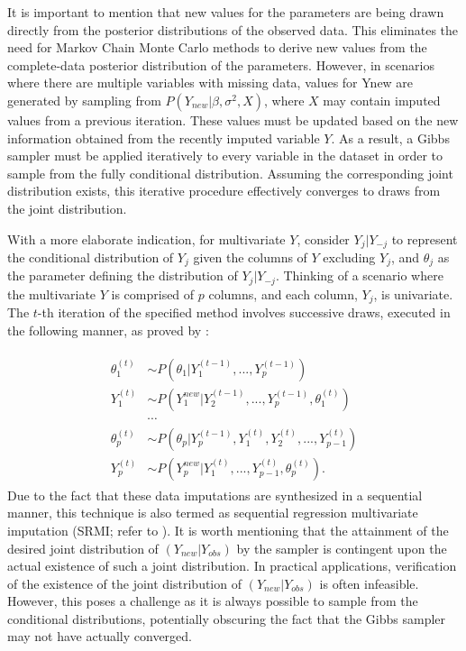It is important to mention that new values for the parameters are being drawn directly from the posterior distributions of the observed data. This eliminates the need for Markov Chain Monte Carlo methods to derive new values from the complete-data posterior distribution of the parameters. However, in scenarios where there are multiple variables with missing data, values for Ynew are generated by sampling from $P(Y_{new} | \beta, \sigma^2, X)$, where $X$ may contain imputed values from a previous iteration. These values must be updated based on the new information obtained from the recently imputed variable $Y$. As a result, a Gibbs sampler must be applied iteratively to every variable in the dataset in order to sample from the fully conditional distribution. Assuming the corresponding joint distribution exists, this iterative procedure effectively converges to draws from the joint distribution.


With a more elaborate indication, for multivariate $Y$, consider $Y_{j}|Y_{-j}$ to represent the conditional distribution of $Y_{j}$ given the columns of $Y$ excluding $Y_{j}$, and $\theta_{j}$ as the parameter defining the distribution of $Y_{j}|Y_{-j}$. Thinking of a scenario where the multivariate $Y$ is comprised of $p$ columns, and each column, $Y_j$, is univariate. The $t$-th iteration of the specified method involves successive draws, executed in the following manner, as proved by \citet{drechsler2011synthetic}:

\begin{align}
\label{eqn:eqlabel}
\begin{split}
    \theta_{1}^{(t)} &\sim P(\theta_{1}|Y_{1}^{(t-1)},...,Y_{p}^{(t-1)})\\
    Y_{1}^{(t)} &\sim P(Y_{1}^{new}|Y_{2}^{(t-1)},...,Y_{p}^{(t-1)}, \theta_{1}^{(t)})\\
    &\cdots \\
    \theta_{p}^{(t)} &\sim P(\theta_{p}|Y_{p}^{(t-1)},Y_{1}^{(t)},Y_{2}^{(t)},...,Y_{p-1}^{(t)})\\
    Y_{p}^{(t)} &\sim P(Y_{p}^{new}|Y_{1}^{(t)},...,Y_{p-1}^{(t)}, \theta_{p}^{(t)}).
\end{split}
\end{align}
Due to the fact that these data imputations are synthesized in a sequential manner, this technique is also termed as sequential regression multivariate imputation (SRMI; refer to \cite{raghu2001information}). It is worth mentioning that the attainment of the desired joint distribution of $(Y_{new}|Y_{obs})$ by the sampler is contingent upon the actual existence of such a joint distribution. In practical applications, verification of the existence of the joint distribution of $(Y_{new}|Y_{obs})$ is often infeasible. However, this poses a challenge as it is always possible to sample from the conditional distributions, potentially obscuring the fact that the Gibbs sampler may not have actually converged.


